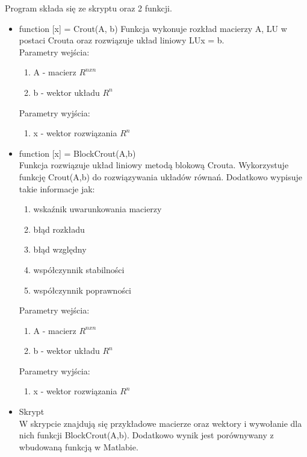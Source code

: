 \documentclass[11pt]{article}
\begin{document}
Program składa się ze skryptu oraz 2 funkcji.
\begin{itemize}
\item function [x] = Crout(A, b)
\newline
Funkcja wykonuje rozkład macierzy A, LU w postaci Crouta oraz rozwiązuje układ liniowy LUx = b.\\
Parametry wejścia:
\begin{enumerate}
  \item A - macierz $R^{nxn}$
  \item b - wektor układu $R^n$
\end{enumerate}
Parametry wyjścia:
\begin{enumerate}
  \item x - wektor rozwiązania $R^n$
\end{enumerate}
\item function [x] = BlockCrout(A,b)\\
Funkcja rozwiązuje układ liniowy metodą blokową Crouta. Wykorzystuje funkcję Crout(A,b) do rozwiązywania układów równań. Dodatkowo wypisuje takie informacje jak:
\begin{enumerate}
    \item wskaźnik uwarunkowania macierzy
    \item błąd rozkładu
    \item błąd względny
    \item współczynnik stabilności
    \item współczynnik poprawności
\end{enumerate}
Parametry wejścia:
\begin{enumerate}
  \item A - macierz $R^{nxn}$
  \item b - wektor układu $R^n$
\end{enumerate}
Parametry wyjścia:
\begin{enumerate}
  \item  x - wektor rozwiązania $R^n$
\end{enumerate}
\item Skrypt\\
W skrypcie znajdują się przykładowe macierze oraz wektory i wywołanie dla nich funkcji BlockCrout(A,b). Dodatkowo wynik jest porównywany z wbudowaną funkcją w Matlabie.
\end{itemize}

\break
\end{document}
